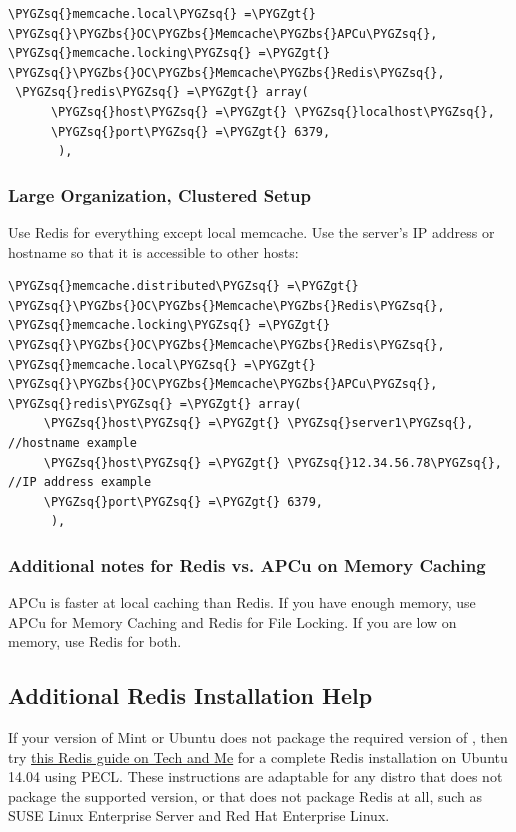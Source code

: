 \documentclass[letterpaper,10pt,english]{sphinxmanual}
\def\PYGZbs{\char`\\}
\def\PYGZgt{\char`\>}
\def\PYGZsq{\char`\'}
\renewcommand\PYGZsq{\textquotesingle}
\begin{document}
\begin{Verbatim}[commandchars=\\\{\}]
\PYGZsq{}memcache.local\PYGZsq{} =\PYGZgt{} \PYGZsq{}\PYGZbs{}OC\PYGZbs{}Memcache\PYGZbs{}APCu\PYGZsq{},
\PYGZsq{}memcache.locking\PYGZsq{} =\PYGZgt{} \PYGZsq{}\PYGZbs{}OC\PYGZbs{}Memcache\PYGZbs{}Redis\PYGZsq{},
 \PYGZsq{}redis\PYGZsq{} =\PYGZgt{} array(
      \PYGZsq{}host\PYGZsq{} =\PYGZgt{} \PYGZsq{}localhost\PYGZsq{},
      \PYGZsq{}port\PYGZsq{} =\PYGZgt{} 6379,
       ),
\end{Verbatim}


\subsubsection{Large Organization, Clustered Setup}
\label{configuration_server/caching_configuration:large-organization-clustered-setup}
Use Redis for everything except local memcache. Use the server's IP address or hostname so that it is accessible to other hosts:

\begin{Verbatim}[commandchars=\\\{\}]
\PYGZsq{}memcache.distributed\PYGZsq{} =\PYGZgt{} \PYGZsq{}\PYGZbs{}OC\PYGZbs{}Memcache\PYGZbs{}Redis\PYGZsq{},
\PYGZsq{}memcache.locking\PYGZsq{} =\PYGZgt{} \PYGZsq{}\PYGZbs{}OC\PYGZbs{}Memcache\PYGZbs{}Redis\PYGZsq{},
\PYGZsq{}memcache.local\PYGZsq{} =\PYGZgt{} \PYGZsq{}\PYGZbs{}OC\PYGZbs{}Memcache\PYGZbs{}APCu\PYGZsq{},
\PYGZsq{}redis\PYGZsq{} =\PYGZgt{} array(
     \PYGZsq{}host\PYGZsq{} =\PYGZgt{} \PYGZsq{}server1\PYGZsq{},  //hostname example
     \PYGZsq{}host\PYGZsq{} =\PYGZgt{} \PYGZsq{}12.34.56.78\PYGZsq{},  //IP address example
     \PYGZsq{}port\PYGZsq{} =\PYGZgt{} 6379,
      ),
\end{Verbatim}


\subsubsection{Additional notes for Redis vs. APCu on Memory Caching}
\label{configuration_server/caching_configuration:additional-notes-for-redis-vs-apcu-on-memory-caching}
APCu is faster at local caching than Redis. If you have enough memory, use APCu for Memory Caching
and Redis for File Locking. If you are low on memory, use Redis for both.


\subsection{Additional Redis Installation Help}
\label{configuration_server/caching_configuration:additional-redis-installation-help}\label{configuration_server/caching_configuration:install-redis-label}
If your version of Mint or Ubuntu does not package the required version of
, then try \href{https://www.techandme.se/how-to-configure-redis-cache-in-ubuntu-14-04-with-owncloud/}{this Redis guide on Tech and Me} for a complete Redis installation on Ubuntu 14.04 using PECL.
These instructions are adaptable for any distro that does not package the
supported version, or that does not package Redis at all, such as SUSE Linux
Enterprise Server and Red Hat Enterprise Linux.
\end{document}
